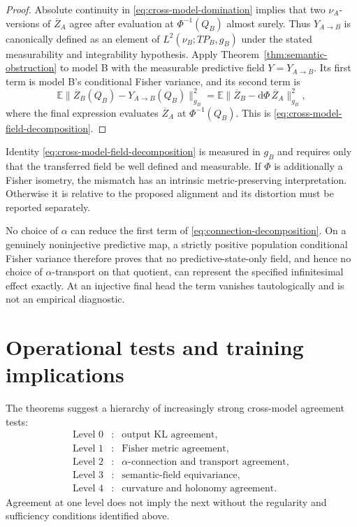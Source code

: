 \documentclass[11pt]{article}
\theoremstyle{definition}
\theoremstyle{remark}
\newcommand{\E}{\mathbb{E}}
\newcommand{\dd}{\mathrm{d}}
\begin{document}
\begin{proof}
Absolute continuity in \eqref{eq:cross-model-domination} implies that two
$\nu_A$-versions of $\overline Z_A$ agree after evaluation at
$\Phi^{-1}(Q_B)$ almost surely. Thus $Y_{A\to B}$ is canonically defined as an
element of $L^2(\nu_B;TP_B,g_B)$ under the stated measurability and
integrability hypothesis.
Apply Theorem~\ref{thm:semantic-obstruction} to model B with the measurable predictive field $Y=Y_{A\to B}$. Its first term is model B's conditional Fisher variance, and its second term is
\begin{equation}
    \E\|\overline Z_B(Q_B)-Y_{A\to B}(Q_B)\|_{g_B}^2
    =\E\|\overline Z_B-\dd\Phi\,\overline Z_A\|_{g_B}^2,
\end{equation}
where the final expression evaluates $\overline Z_A$ at $\Phi^{-1}(Q_B)$. This is \eqref{eq:cross-model-field-decomposition}.
\end{proof}

Identity \eqref{eq:cross-model-field-decomposition} is measured in $g_B$ and requires only that the transferred field be well defined and measurable. If $\Phi$ is additionally a Fisher isometry, the mismatch has an intrinsic metric-preserving interpretation. Otherwise it is relative to the proposed alignment and its distortion must be reported separately.

No choice of $\alpha$ can reduce the first term of \eqref{eq:connection-decomposition}. On a genuinely noninjective predictive map, a strictly positive population conditional Fisher variance therefore proves that no predictive-state-only field, and hence no choice of $\alpha$-transport on that quotient, can represent the specified infinitesimal effect exactly. At an injective final head the term vanishes tautologically and is not an empirical diagnostic.

\section{Operational tests and training implications}

The theorems suggest a hierarchy of increasingly strong cross-model agreement tests:
\begin{equation}
\begin{array}{ccl}
\text{Level 0} &:& \text{output KL agreement},\\
\text{Level 1} &:& \text{Fisher metric agreement},\\
\text{Level 2} &:& \alpha\text{-connection and transport agreement},\\
\text{Level 3} &:& \text{semantic-field equivariance},\\
\text{Level 4} &:& \text{curvature and holonomy agreement}.
\end{array}
\end{equation}
Agreement at one level does not imply the next without the regularity and sufficiency conditions identified above.
\end{document}
